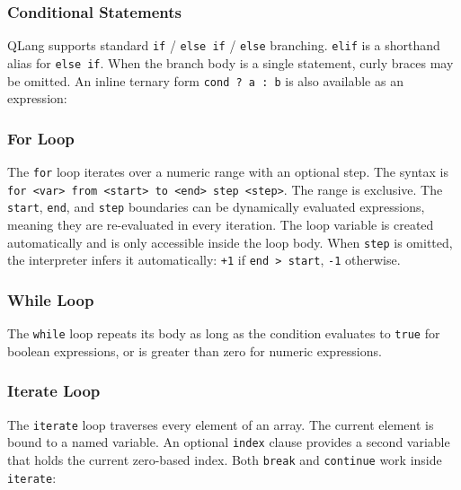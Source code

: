 \subsubsection{Conditional Statements}

QLang supports standard \texttt{if} / \texttt{else if} / \texttt{else}
branching. \texttt{elif} is a shorthand alias for \texttt{else if}.
When the branch body is a single statement, curly braces may be omitted.
An inline ternary form \texttt{cond ? a : b} is also available as an
expression:




\newpage
\subsubsection{For Loop}

The \texttt{for} loop iterates over a numeric range with an optional step.
The syntax is \texttt{for <var> from <start> to <end> step <step>}. The
range is exclusive. The \texttt{start}, \texttt{end}, and \texttt{step} boundaries can be dynamically evaluated expressions, meaning they are re-evaluated in every iteration. The loop variable is created
automatically and is only accessible inside the loop body. When
\texttt{step} is omitted, the interpreter infers it automatically:
\texttt{+1} if \texttt{end > start}, \texttt{-1} otherwise.



\subsubsection{While Loop}

The \texttt{while} loop repeats its body as long as the condition evaluates
to \texttt{true} for boolean expressions, or is greater than zero for numeric
expressions.



\newpage
\subsubsection{Iterate Loop}

The \texttt{iterate} loop traverses every element of an array. The current
element is bound to a named variable.
An optional \texttt{index} clause provides a second variable that holds
the current zero-based index. Both \texttt{break} and \texttt{continue}
work inside \texttt{iterate}:

